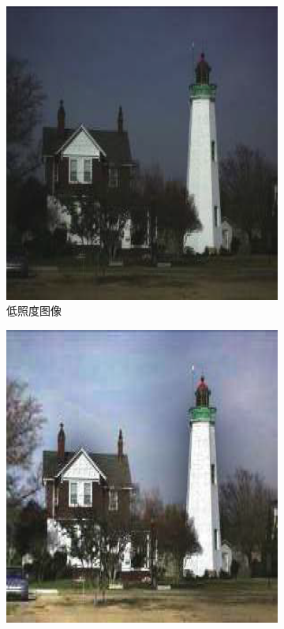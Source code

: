 \documentclass[a4paper, 10pt]{article}
\begin{document}
	\begin{figure}[htb] 
		\centering 
		\begin{subfigure}{0.18\textwidth}
			\includegraphics[width=\linewidth]{picture/LLIE/Retinex Model/input}
			\captionsetup{font=scriptsize}
			\caption{低照度图像}
			\label{fig: Retinex Model_input}
		\end{subfigure}
		\begin{subfigure}{0.18\textwidth}
			\includegraphics[width=\linewidth]{picture/LLIE/Retinex Model/Retinex}

\end{subfigure}
\end{figure}
\end{document}
